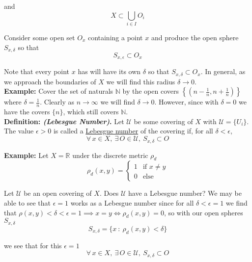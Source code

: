 \documentclass[12pt]{article}
\newlength\tindent
\renewcommand{\indent}{\hspace*{\tindent}}
\newcommand{\R}{\mathbb R}
\newcommand{\N}{\mathbb N}
\begin{document}
and
\begin{equation*}
	X \subset \bigcup_{i\in I} O_i
\end{equation*}

Consider some open set $O_x$ containing a point $x$ and produce the open sphere $S_{x,\delta}$ so that 
\begin{equation*}
	S_{x,\epsilon} \subset O_x
\end{equation*}

\indent Note that every point $x$ has will have its own $\delta$ so that $S_{x,\delta} \subset O_x$. In general, as we approach the boundaries of $X$ we will find this radius $\delta\to 0$. \\

%
%
{\bf Example:} Cover the set of naturals $\N$ by the open covers $\left\{\left(n - \frac{1}{n}, n + \frac{1}{n}\right)\right\}$ where $\delta = \frac{1}{n}$. Clearly as $n \to \infty$ we will find $\delta\to 0$. However, since with $\delta = 0$ we have the covers $\{n\}$, which still covers $\N$. \\

%
%
{\bf Definition: {\em (Lebesgue Number)}.} Let $\mathcal U$ be some covering of $X$ with $\mathcal U = \{U_i\}$. The value $\epsilon > 0$ is called a \underline{Lebesgue number} of the covering if, for all $\delta < \epsilon$,
\begin{equation*}
	\forall\,x\in X,~\exists\,O\in\mathcal U,~S_{x,\delta} \subset O
\end{equation*}

%
%
{\bf Example:} Let $X = \R$ under the discrete metric $\rho_d$
\begin{equation*}
	\rho_d(x,y) =
	\begin{cases}
		1 & \text{if $x \neq y$} \\
		0 & \text{else}
	\end{cases}
\end{equation*}

\indent Let $\mathcal U$ be an open covering of $X$. Does $\mathcal U$ have a Lebesgue number? We may be able to see that $\epsilon = 1$ works as a Lebesgue number since for all $\delta < \epsilon = 1$ we find that $\rho(x, y) < \delta < \epsilon = 1 \implies x = y \iff \rho_d(x,y) = 0$, so with our open spheres $S_{x,\delta}$
\begin{equation*}
	S_{x,\delta} = \{x~:~\rho_d(x,y) < \delta\}
\end{equation*}

we see that for this $\epsilon = 1$
\begin{equation*}
	\forall\,x\in X,~\exists\,O\in\mathcal U,~S_{x,\delta} \subset O
\end{equation*}
\end{document}
